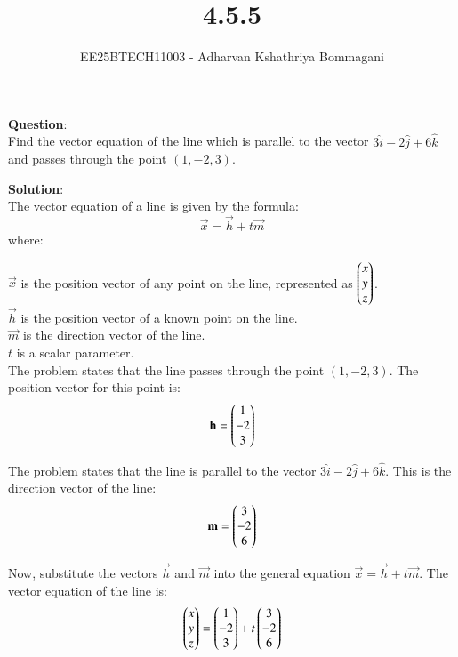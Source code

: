 \documentclass[journal]{IEEEtran}
\begin{document}

\vspace{3cm}

\title{4.5.5}
\author{EE25BTECH11003 - Adharvan Kshathriya Bommagani}
{\newpage\maketitle}

\renewcommand{\thefigure}{\theenumi}
\renewcommand{\thetable}{\theenumi}
\setlength{\intextsep}{10pt}

\textbf{Question}:\\
Find the vector equation of the line which is parallel to the vector $3\hat{i} - 2\hat{j} + 6\hat{k}$ and passes through the point $(1, -2, 3)$.

\bigskip

\textbf{Solution}:\\

The vector equation of a line is given by the formula:
$$ \vec{x} = \vec{h} + t\vec{m} $$
where:

    \textbf{$\vec{x}$} is the position vector of any point on the line, represented as $\begin{pmatrix}x \\ y \\ z\end{pmatrix}$.\\
    \textbf{$\vec{h}$} is the position vector of a known point on the line.\\
    \textbf{$\vec{m}$} is the direction vector of the line.\\
    \textbf{$t$} is a scalar parameter.\\



The problem states that the line passes through the point $(1, -2, 3)$. The position vector for this point is:
\begin{align*}
\mathbf{h} = \begin{pmatrix}1 \\ -2 \\ 3\end{pmatrix}
\end{align*}


The problem states that the line is parallel to the vector $3\hat{i} - 2\hat{j} + 6\hat{k}$. This is the direction vector of the line:
\begin{align*}
\mathbf{m} = \begin{pmatrix}3 \\ -2 \\ 6\end{pmatrix}
\end{align*}


Now, substitute the vectors $\vec{h}$ and $\vec{m}$ into the general equation $\vec{x} = \vec{h} + t\vec{m}$.
The vector equation of the line is:
\begin{align*}
\begin{pmatrix}x \\ y \\ z\end{pmatrix} = \begin{pmatrix}1 \\ -2 \\ 3\end{pmatrix} + t \begin{pmatrix}3 \\ -2 \\ 6\end{pmatrix}
\end{align*}
\end{document}
